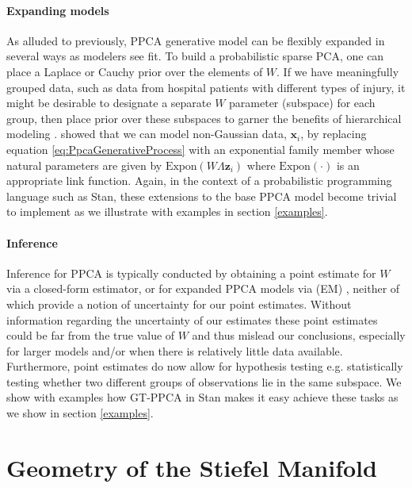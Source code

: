 \documentclass{article}
\newcommand{\mb}[1]{\mathbf{#1}}
\begin{document}
\paragraph{Expanding models}
As alluded to previously, PPCA generative model can be flexibly expanded in several ways as modelers see fit. To build a probabilistic sparse PCA, one can place a Laplace or Cauchy prior over the elements of $W$. If we have meaningfully grouped data, such as data from hospital patients with different types of injury, it might be desirable to designate a separate $W$ parameter (subspace) for each group, then place prior over these subspaces to garner the benefits of hierarchical modeling \citep[chapt.~5]{gelman2014bayesian}. \citet{mohamed2009bayesian} showed that we can model non-Gaussian data, $\mb{x}_i$, by replacing equation \ref{eq:PpcaGenerativeProcess} with an exponential family member whose natural parameters are given by $\mathrm{Expon}(W\Lambda \mb{z}_i)$ where $\mathrm{Expon}(\cdot)$ is an appropriate link function.  Again, in the context of a probabilistic programming language such as Stan, these extensions to the base PPCA model become trivial to implement as we illustrate with examples in section \ref{examples}.

\paragraph{Inference}
Inference for PPCA is typically conducted by obtaining a point estimate for $W$ via a closed-form estimator, or for expanded PPCA models via (EM) \citep[chapt.~12.2]{murphy2012machine}, neither of which provide a notion of uncertainty for our point estimates. Without information regarding the uncertainty of our estimates these point estimates could be far from the true value of $W$ and thus mislead our conclusions, especially for larger models and/or when there is relatively little data available. Furthermore, point estimates do now allow for hypothesis testing e.g. statistically testing whether two different groups of observations lie in the same subspace. We show with examples how GT-PPCA in Stan makes it easy achieve these tasks as we show in section \ref{examples}.

\section{Geometry of the Stiefel Manifold} \label{geometry}
\end{document}
